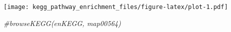 \documentclass[
]{article}
\newenvironment{Shaded}{\begin{snugshade}}{\end{snugshade}}
\newcommand{\CommentTok}[1]{\textcolor[rgb]{0.56,0.35,0.01}{\textit{#1}}}
\begin{document}
\texttt{[image: kegg\_pathway\_enrichment\_files/figure-latex/plot-1.pdf]}

\begin{Shaded}
\begin{Highlighting}[]
\CommentTok{\#browseKEGG(enKEGG, map00564)}
\end{Highlighting}
\end{Shaded}
\end{document}
